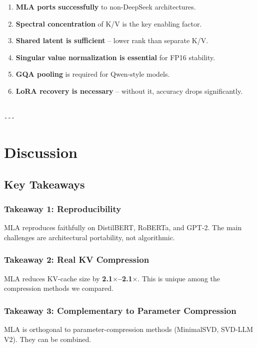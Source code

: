 \begin{enumerate}
\item \textbf{MLA ports successfully} to non-DeepSeek architectures.
\item \textbf{Spectral concentration} of K/V is the key enabling factor.
\item \textbf{Shared latent is sufficient} -- lower rank than separate K/V.
\item \textbf{Singular value normalization is essential} for FP16 stability.
\item \textbf{GQA pooling} is required for Qwen-style models.
\item \textbf{LoRA recovery is necessary} -- without it, accuracy drops
  significantly.
\end{enumerate}
\begin{lstlisting}

---
\end{lstlisting}


\section{Discussion}

\subsection{Key Takeaways}

\subsubsection{Takeaway 1: Reproducibility}

MLA reproduces faithfully on DistilBERT, RoBERTa, and GPT-2. The main 
challenges are architectural portability, not algorithmic.

\subsubsection{Takeaway 2: Real KV Compression}

MLA reduces KV-cache size by \textbf{2.1$\times$--2.1$\times$}. This is 
unique among the compression methods we compared.

\subsubsection{Takeaway 3: Complementary to Parameter Compression}

MLA is orthogonal to parameter-compression methods (MinimalSVD, SVD-LLM V2). 
They can be combined.

